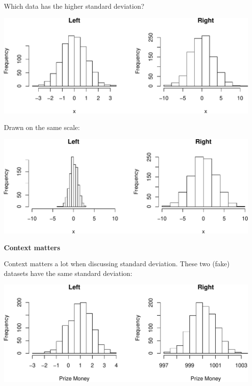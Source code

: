 \documentclass[ignorenonframetext,]{beamer}
\begin{document}
\begin{frame}{}
\protect\hypertarget{section-48}{}

Which data has the higher standard deviation?

\vspace{1ex}\scriptsize

\includegraphics{lecture-03_files/figure-beamer/unnamed-chunk-27-1.pdf}

\end{frame}

\begin{frame}{}
\protect\hypertarget{section-49}{}

Drawn on the same scale:

\vspace{1ex}\scriptsize

\includegraphics{lecture-03_files/figure-beamer/unnamed-chunk-28-1.pdf}

\end{frame}

\begin{frame}{}
\protect\hypertarget{section-50}{}

\textbf{\large Context matters}

Context matters a lot when discussing standard deviation. These two
(fake) datasets have the same standard deviation:

\includegraphics{lecture-03_files/figure-beamer/unnamed-chunk-29-1.pdf}

\end{frame}
\end{document}
